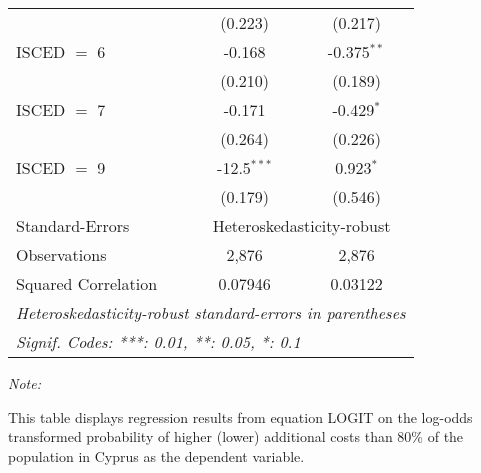 \begin{table}[htbp!]
\begin{adjustbox}{width = 1\textwidth, max height = 0.95\textheight, center}
\begin{threeparttable}[b]
\begin{tabular}{lcc}
                                 & (0.223)        & (0.217)\\   
            ISCED $=$ 6          & -0.168         & -0.375$^{**}$\\   
                                 & (0.210)        & (0.189)\\   
            ISCED $=$ 7          & -0.171         & -0.429$^{*}$\\   
                                 & (0.264)        & (0.226)\\   
            ISCED $=$ 9          & -12.5$^{***}$  & 0.923$^{*}$\\   
                                 & (0.179)        & (0.546)\\   
            \midrule 
            Standard-Errors & \multicolumn{2}{c}{Heteroskedasticity-robust} \\ 
            Observations         & 2,876          & 2,876\\  
            Squared Correlation  & 0.07946        & 0.03122\\  
            \midrule \midrule
            \multicolumn{3}{l}{\emph{Heteroskedasticity-robust standard-errors in parentheses}}\\
            \multicolumn{3}{l}{\emph{Signif. Codes: ***: 0.01, **: 0.05, *: 0.1}}\\
         \end{tabular}
         
         \begin{tablenotes}\item \medskip \textit{Note:}
            \item This table displays regression results from equation LOGIT on the log-odds transformed probability of higher (lower) additional costs than 80\% of the population in Cyprus as the dependent variable. 
         \end{tablenotes}
      \end{threeparttable}
   \end{adjustbox}
\end{table}


